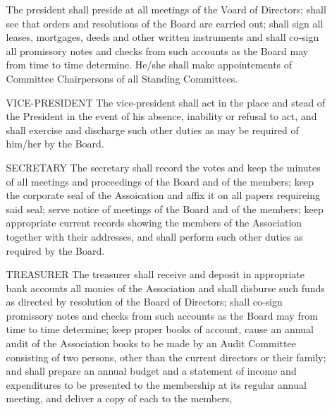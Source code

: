 \documentclass[12pt, letterpaper]{article}
\begin{document}
\begin{enumerate}
\begin{itemize}
    The president shall preside at all meetings of the Voard of Directors; shall see that orders and resolutions of the Board are carried out; shall sign all leases, mortgages, deeds and other written instruments and shall co-sign all promissory notes and checks from such accounts as the Board may from time to time determine.
    He/she shall make appointements of Committee Chairpersons of all Standing Committees.
   \item[VICE-PRESIDENT]
    The vice-president shall act in the place and stead of the President in the event of his absence, inability or refusal to act, and shall exercise and discharge such other duties as may be required of him/her by the Board.
   \item[SECRETARY]
    The secretary shall record the votes and keep the minutes of all meetings and proceedings of the Board and of the members; keep the corporate seal of the Assoication and affix it on all papers requireing said seal; serve notice of meetings of the Board and of the members; keep appropriate current records showing the members of the Association together with their addresses, and shall perform such other duties as required by the Board.
   \item[TREASURER]
    The treasurer shall receive and deposit in appropriate bank accounts all monies of the Association and shall disburse such funds as directed by resolution of the Board of Directors; shall co-sign promissory notes and checks from such accounts as the Board may from time to time determine; keep proper books of account, cause an annual audit of the Association books to be made by an Audit Committee consisting of two persons, other than the current directors or their family; and shall prepare an annual budget and a statement of income and expenditures to be presented to the membership at its regular annual meeting, and deliver a copy of each to the members,
  \end{itemize}
\end{enumerate}

\end{document}
